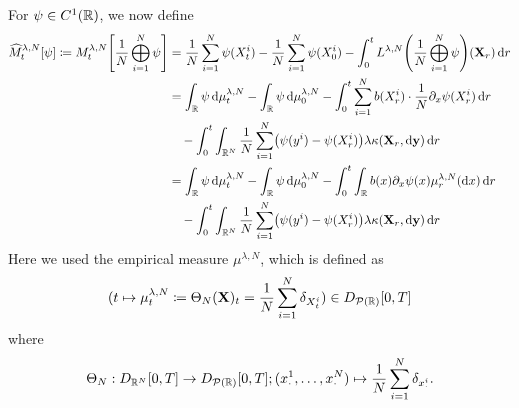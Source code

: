 \documentclass{article}
\begin{document}
\noindent For $\psi \in C^1(\mathbb{R})$, we now define
\begin{equation}\label{eq:hat-M-derivation-start}
\begin{split}
    \widehat{M}_t^{\lambda, N}[\psi] \coloneqq
    M_t^{\lambda, N}\sbr*{\frac{1}{N} \bigoplus_{i=1}^N \psi}
    &= \frac{1}{N} \sum_{i=1}^N \psi(X_t^i) - \frac{1}{N} \sum_{i=1}^N \psi(X_0^i) - \int_0^t L^{\lambda, N} \br*{\frac{1}{N}\bigoplus_{i=1}^N \psi} (\bm{X}_r) \odif{r} \\
    &= \int_\potspace \psi \odif{\mu_t^{\lambda, N}} - \int_\potspace \psi \odif{\mu_0^{\lambda, N}}
    - \int_0^t \sum_{i=1}^N b(X_{r}^i) \cdot \frac{1}{N} \partial_{x} \psi(X_{r}^i) \odif{r} \\
    &\quad - \int_0^t \int_{\potspace^N} \frac{1}{N} \sum_{i=1}^N \br*{ \psi(y^i) - \psi(X_{r}^i) } \lambda \kappa(\bm{X}_r, \odif{\bm{y}}) \odif{r} \\
    &= \int_\potspace \psi \odif{\mu_t^{\lambda, N}} - \int_\potspace \psi \odif{\mu_0^{\lambda, N}}
    - \int_0^t \int_\potspace b(x) \partial_{x} \psi(x) \mu_r^{\lambda, N}(\odif{x}) \odif{r} \\
    &\quad - \int_0^t \int_{\potspace^N} \frac{1}{N} \sum_{i=1}^N \br*{ \psi(y^i) - \psi(X_{r}^i) } \lambda \kappa(\bm{X}_r, \odif{\bm{y}}) \odif{r} \\
\end{split}
\end{equation}
Here we used the empirical measure $\mu^{\lambda,N}$, which is defined as
\begin{equation}
    \lparen t \mapsto \mu_t^{\lambda, N} \coloneqq \Theta_N(\mathbf{X})_t = \frac{1}{N} \sum_{i=1}^N \delta_{X_t^i} \rparen \in D_{\mathcal{P}(\mathbb{R})}[0,T]
\end{equation}
where
\begin{equation}
    \Theta_N : D_{\mathbb{R}^N}[0,T] \to D_{\mathcal{P}(\mathbb{R})}[0,T]; (x_\cdot^1,\dots,x_\cdot^N) \mapsto \frac{1}{N} \sum_{i=1}^N \delta_{x_\cdot^i}.
\end{equation}
\end{document}
